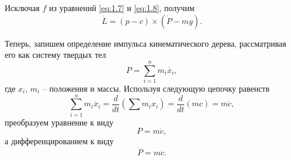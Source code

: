 Исключая $f$ из уравнений \ref{eq:1.7} и \ref{eq:1.8}, получим
\begin{equation*}
\dot{L} = (p - c) \times (\dot{P} - mg). \tag{1.9}\label{eq:1.9}
\end{equation*}

Теперь, запишем определение импульса кинематического дерева, рассматривая его как систему твердых тел
\begin{equation*}
  P = \sum_{i = 1}^{n} m_{i} \dot{x_{i}},
\end{equation*}
где $x_{i}$, $m_{i}$ -- положения и массы. Используя следующую цепочку равенств
\begin{equation*}
  \sum_{i = 1}^{n} m_{i} \dot{x_{i}} = \frac{d}{dt} (\sum m_{i} x_{i}) = \frac{d}{dt} (mc) = m \dot{c},
\end{equation*}
преобразуем уравнение к виду
\begin{equation}
  P = m \dot{c}, \tag{1.10}\label{eq:1.10}
\end{equation}
а дифференцированием к виду
\begin{equation}
  \dot{P} = m \ddot{c}. \tag{1.11}\label{eq:1.11}
\end{equation}
